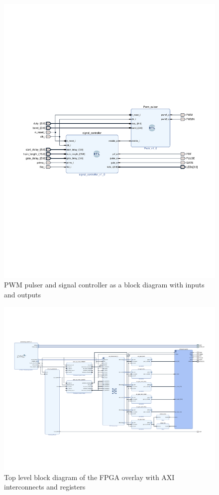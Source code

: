 \begin{figure}[htbp]
	\centering
	\includegraphics[width=.8\linewidth]{Figures/4_controlsystem_pulser.pdf}
	\caption{PWM pulser and signal controller as a block diagram with inputs and outputs}
	\label{fig:4_controlsystem_pulser}
\end{figure}

\begin{figure}[htbp]
	\centering
	\includegraphics[width=\linewidth]{Figures/4_controlsystem_top_bd.pdf}
	\caption{Top level block diagram of the FPGA overlay with AXI interconnects and registers}
	\label{fig:4_controlsystem_top_bd}
\end{figure}

